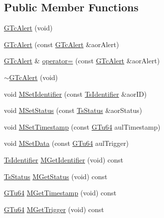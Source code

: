 \subsection*{Public Member Functions}
\begin{DoxyCompactItemize}
\item 
\mbox{\hyperlink{class_g_n_common_1_1_g_tc_alert_ab4874dff7fccf2444439e7e5e4304125}{G\+Tc\+Alert}} (void)
\item 
\mbox{\hyperlink{class_g_n_common_1_1_g_tc_alert_a90f33fbcc71ed945ab1a0dee83bd3ccc}{G\+Tc\+Alert}} (const \mbox{\hyperlink{class_g_n_common_1_1_g_tc_alert}{G\+Tc\+Alert}} \&aor\+Alert)
\item 
\mbox{\hyperlink{class_g_n_common_1_1_g_tc_alert}{G\+Tc\+Alert}} \& \mbox{\hyperlink{class_g_n_common_1_1_g_tc_alert_aba9a3373bd29884b049dfc525f655e5c}{operator=}} (const \mbox{\hyperlink{class_g_n_common_1_1_g_tc_alert}{G\+Tc\+Alert}} \&aor\+Alert)
\item 
\mbox{\hyperlink{class_g_n_common_1_1_g_tc_alert_ad222cd054ec90b1aa8bf6e58e09d608b}{$\sim$\+G\+Tc\+Alert}} (void)
\item 
void \mbox{\hyperlink{class_g_n_common_1_1_g_tc_alert_acbb3761e5ca1af6896c20933be06255f}{M\+Set\+Identifier}} (const \mbox{\hyperlink{struct_g_n_common_1_1_g_tc_alert_1_1_ts_identifier}{Ts\+Identifier}} \&aor\+ID)
\item 
void \mbox{\hyperlink{class_g_n_common_1_1_g_tc_alert_a6e5a7e686b2e78573337c18a49f8d421}{M\+Set\+Status}} (const \mbox{\hyperlink{struct_g_n_common_1_1_g_tc_alert_1_1_ts_status}{Ts\+Status}} \&aor\+Status)
\item 
void \mbox{\hyperlink{class_g_n_common_1_1_g_tc_alert_aca52809ad95713c5ad550cf5d1fc51fa}{M\+Set\+Timestamp}} (const \mbox{\hyperlink{namespace_g_n_common_a01e8527dabf7ab4f123156b0701945eb}{G\+Tu64}} aul\+Timestamp)
\item 
void \mbox{\hyperlink{class_g_n_common_1_1_g_tc_alert_a04f768514f3e12f95e3a6887b02c0576}{M\+Set\+Data}} (const \mbox{\hyperlink{namespace_g_n_common_a01e8527dabf7ab4f123156b0701945eb}{G\+Tu64}} aul\+Trigger)
\item 
\mbox{\hyperlink{struct_g_n_common_1_1_g_tc_alert_1_1_ts_identifier}{Ts\+Identifier}} \mbox{\hyperlink{class_g_n_common_1_1_g_tc_alert_a0baa69459d87c780b3bad22883f29dec}{M\+Get\+Identifier}} (void) const
\item 
\mbox{\hyperlink{struct_g_n_common_1_1_g_tc_alert_1_1_ts_status}{Ts\+Status}} \mbox{\hyperlink{class_g_n_common_1_1_g_tc_alert_a8f37913185860432ccdd65dea58ffe37}{M\+Get\+Status}} (void) const
\item 
\mbox{\hyperlink{namespace_g_n_common_a01e8527dabf7ab4f123156b0701945eb}{G\+Tu64}} \mbox{\hyperlink{class_g_n_common_1_1_g_tc_alert_ae00bea560ef82ed36c4b741d92bd27e6}{M\+Get\+Timestamp}} (void) const
\item 
\mbox{\hyperlink{namespace_g_n_common_a01e8527dabf7ab4f123156b0701945eb}{G\+Tu64}} \mbox{\hyperlink{class_g_n_common_1_1_g_tc_alert_a9e582dccb2205b74923c5d93d787811e}{M\+Get\+Trigger}} (void) const
\end{DoxyCompactItemize}

